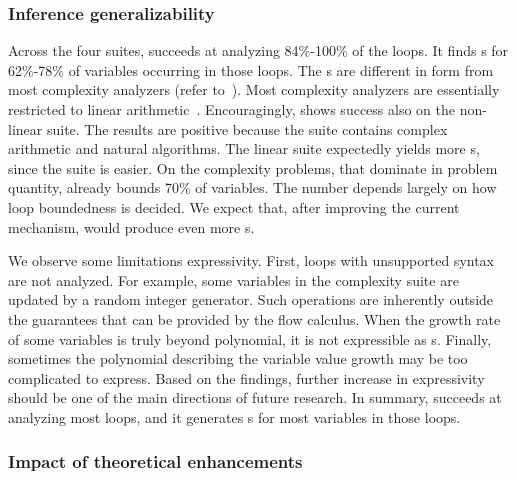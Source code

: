 \subsubsection{Inference generalizability}
\label{subsec:rq1-res}

Across the four suites, \ndx{\impl} succeeds at analyzing 84\%-100\% of the
loops. It finds s for 62\%-78\% of variables occurring in
those loops. The s are different in form from most complexity
analyzers (refer to~\cite{lommen2023,aubert2023b}). Most complexity analyzers
are essentially restricted to linear arithmetic~\cite{lommen2023}.
Encouragingly, \ndx{\impl} shows success also on the non-linear suite. The
results are positive because the suite contains complex arithmetic and natural
algorithms. The linear suite expectedly yields more s, since
the suite is easier. On the complexity problems, that dominate in problem
quantity, \ndx{\impl} already bounds 70\% of variables. The number depends
largely on how loop boundedness is decided. We expect that, after improving the
current mechanism, \ndx{\impl} would produce even more s.

We observe some limitations \wrt expressivity. First,
loops with unsupported syntax are not analyzed. For example, some variables in
the complexity suite are updated by a random integer
generator. Such operations are inherently outside the
guarantees that can be provided by the flow calculus. When
the growth rate of some variables is truly beyond polynomial, it is not
expressible as s. Finally, sometimes the polynomial describing
the variable value growth may be too complicated to express. Based on the
findings, further increase in expressivity should be one of the main directions
of future research. In summary, \ndx{\impl} succeeds at
analyzing most loops, and it generates s for most variables
in those loops.

\subsubsection{Impact of theoretical enhancements}\label{subsec:rq2-res}

